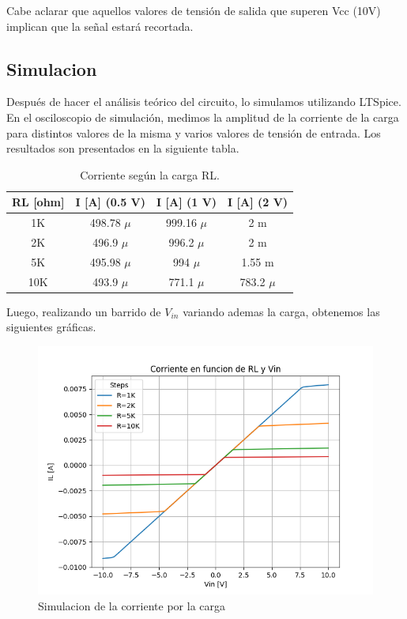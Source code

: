 Cabe aclarar que aquellos valores de tensión de salida que superen Vcc (10V) implican que la señal estará recortada.


\subsection{Simulacion}
Después de hacer el análisis teórico del circuito, lo simulamos utilizando LTSpice. En el osciloscopio de simulación, medimos la amplitud de la corriente de la carga para distintos valores de la misma y varios valores de tensión de entrada. Los resultados son presentados en la siguiente tabla.

\begin{table}[h!]
\centering
\begin{tabular}{|c|c|c|c|}
\hline
\textbf{RL [ohm]} & \textbf{I [A] (0.5 V)} & \textbf{I [A] (1 V)} & \textbf{I [A] (2 V)} \\ \hline
1K    & 498.78 $\mu$  & 999.16 $\mu$  & 2 m \\ \hline
2K    & 496.9 $\mu$  & 996.2 $\mu$  & 2 m \\ \hline
5K    & 495.98 $\mu$  & 994 $\mu$  & 1.55 m \\ \hline
10K   & 493.9 $\mu$  & 771.1 $\mu$  & 783.2 $\mu$ \\ \hline
\end{tabular}
\caption{Corriente según la carga RL.}
\label{tab:iL_vs_RL}
\end{table}
Luego, realizando un barrido de $V_{in}$ variando ademas la carga, obtenemos las siguientes gráficas.

\begin{figure}[H]
    \centering
    \includegraphics[width=0.70\linewidth]{Secciones/Circuito2/TP1_2_i_vs_Vin_RL.png}
    \caption{Simulacion de la corriente por la carga}
\end{figure}

